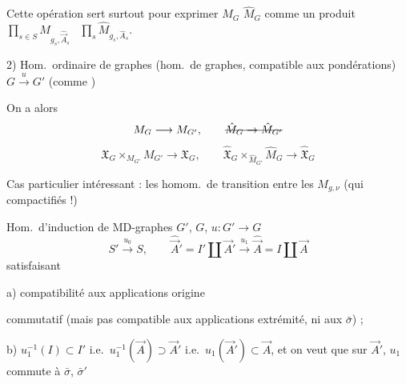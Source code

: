 \documentclass[11pt,a4paper]{article}
\begin{document}
Cette opération sert surtout pour exprimer \add{\ill{}} $M_G$  $\hat{M}_G$ comme un produit $\prod_{s\in S}M_{g_s,\hat{\vec{A}}_s}$ \ $\prod_s\hat{M}_{g_s,\hat{A}_s}$.

2)  Hom.\ ordinaire de graphes  (hom.\ de graphes, compatible aux pondérations) $G\xrightarrow{u}G'$ (comme )



On a alors
\[
M_G\longrightarrow M_{G'},\qquad
\text{\struck{$\hat{M}_G\to\hat{M}_{G'}$}}
\]
\[
\mathfrak{X}_G\times_{M_{G'}}M_{G'}\longrightarrow\mathfrak{X}_G,
\qquad
\hat{\mathfrak{X}}_G\times_{\hat{M}_{G'}}\hat{M}_G\to\hat{\mathfrak{X}}_G
\]

Cas particulier  intéressant : les homom.\ de transition entre les $M_{g,\nu}$ (qui  \ill{} \ill{} compactifiés !)


Hom.\ d'induction de MD-graphes $G'$, $G$, $u:G'\to G$
\[
S'\xrightarrow{\ u_0\ }S,\qquad
\hat{\vec{A}}{}'=I'\amalg\vec{A}'\xrightarrow{\ u_1\ }\hat{\vec{A}}=I\amalg\vec{A}
\]
satisfaisant

a) compatibilité aux applications origine


commutatif (mais pas compatible aux applications extrémité, ni aux $\bar\sigma$) ;

b) $u_1^{-1}(I)\subset I'$  i.e.\ $u_1^{-1}(\vec{A})\supset\vec{A}'$ i.e.\ $u_1(\vec{A}')\subset\vec{A}$, et on veut que sur $\vec{A}'$, $u_1$ commute à $\bar\sigma$, $\bar\sigma'$
\end{document}
